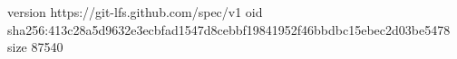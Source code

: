version https://git-lfs.github.com/spec/v1
oid sha256:413c28a5d9632e3ecbfad1547d8cebbf19841952f46bbdbc15ebec2d03be5478
size 87540
